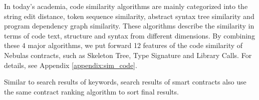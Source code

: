 In today's academia, code similarity algorithms are mainly categorized into the string edit distance, token sequence similarity, abstract syntax tree similarity and program dependency graph similarity. These algorithms describe the similarity in terms of code text, structure and syntax from different dimensions. By combining these 4 major algorithms, we put forward 12 features of the code similarity of Nebulas contracts, such as Skeleton Tree, Type Signature and Library Calls. For details, see Appendix \ref{appendix:sim_code}.

Similar to search results of keywords, search results of smart contracts also use the same contract ranking algorithm to sort final results.